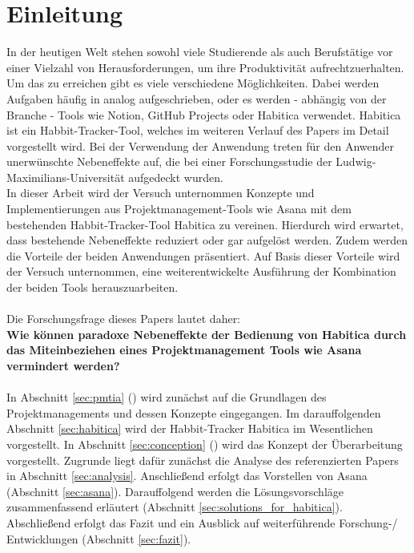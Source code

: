 \documentclass[sigconf, nonacm]{acmart}
\begin{document}
\section{Einleitung}
In der heutigen Welt stehen sowohl viele Studierende als auch Berufstätige vor einer Vielzahl von Herausforderungen, um ihre Produktivität aufrechtzuerhalten. Um das zu erreichen gibt es viele verschiedene Möglichkeiten. Dabei werden Aufgaben häufig in analog aufgeschrieben, oder es werden - abhängig von der Branche - Tools wie Notion, GitHub Projects oder Habitica verwendet.
Habitica ist ein Habbit-Tracker-Tool, welches im weiteren Verlauf des Papers im Detail vorgestellt wird. Bei der Verwendung der Anwendung treten für den Anwender unerwünschte Nebeneffekte auf, die bei einer Forschungsstudie der Ludwig-Maximilians-Universität aufgedeckt wurden. \\
In dieser Arbeit wird der Versuch unternommen Konzepte und Implementierungen aus Projektmanagement-Tools wie Asana mit dem bestehenden Habbit-Tracker-Tool Habitica zu vereinen. Hierdurch wird erwartet, dass bestehende Nebeneffekte reduziert oder gar aufgelöst werden. Zudem werden die Vorteile der beiden Anwendungen präsentiert. Auf Basis dieser Vorteile wird der Versuch unternommen, eine weiterentwickelte Ausführung der Kombination der beiden Tools herauszuarbeiten.
\\
\\
Die Forschungsfrage dieses Papers lautet daher:\\
\textbf{Wie können paradoxe Nebeneffekte der Bedienung \allowbreak von Habitica durch das Miteinbeziehen eines Projektmanagement Tools wie Asana vermindert werden?}
\\
\\
In Abschnitt \ref{sec:pmtia} () wird zunächst auf die Grundlagen des Projektmanagements und dessen Konzepte eingegangen. Im darauffolgenden Abschnitt \ref{sec:habitica} wird der Habbit-Tracker Habitica im Wesentlichen vorgestellt. In Abschnitt \ref{sec:conception} () wird das Konzept der Überarbeitung vorgestellt. Zugrunde liegt dafür zunächst die Analyse des referenzierten Papers in Abschnitt \ref{sec:analysis}. Anschließend erfolgt das Vorstellen von Asana (Abschnitt \ref{sec:asana}). Darauffolgend werden die Lösungsvorschläge zusammenfassend erläutert (Abschnitt \ref{sec:solutions_for_habitica}). Abschließend erfolgt das Fazit und ein Ausblick auf weiterführende Forschung-/ Entwicklungen (Abschnitt \ref{sec:fazit}).
\end{document}
